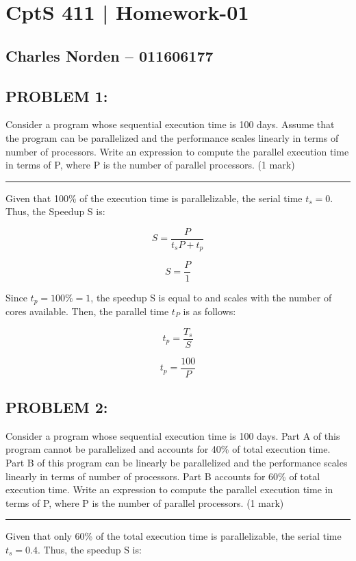 \documentclass[12pt,letterpaper]{article}
\begin{document}
\section*{CptS 411 | Homework-01 }
\subsection*{Charles Norden -- 011606177 }

\subsection*{PROBLEM 1:}
Consider a program whose sequential execution time is 100 days. Assume that the program can be parallelized and the performance scales linearly in terms of number of processors. Write an expression to compute the parallel execution time in terms of P, where P is the number of parallel processors. (1 mark)

\noindent\rule{\textwidth}{1pt}

Given that 100\% of the execution time is parallelizable, the serial time \(t_s = 0\). Thus, the Speedup S is:

\[ S = \frac{P}{t_sP + t_p} \]

\[ S = \frac{P}{1} \]

Since \(t_p = 100\% = 1\), the speedup S is equal to and scales with the number of cores available. Then, the parallel time \(t_{P}\) is as follows:

\[ t_p = \frac{T_s}{S} \]

\[ t_p = \frac{100}{P} \]

\pagebreak


\subsection*{PROBLEM 2:}
Consider a program whose sequential execution time is 100 days. Part A of this program cannot be parallelized and accounts for 40\% of total execution time. Part B of this program can be linearly be parallelized and the performance scales linearly in terms of number of processors. Part B accounts for 60\% of total execution time. Write an expression to compute the parallel execution time in terms of P, where P is the number of parallel processors. (1 mark)

\noindent\rule{\textwidth}{1pt}

Given that only 60\% of the total execution time is parallelizable, the serial time \(t_s = 0.4\). Thus, the speedup S is:
\end{document}
